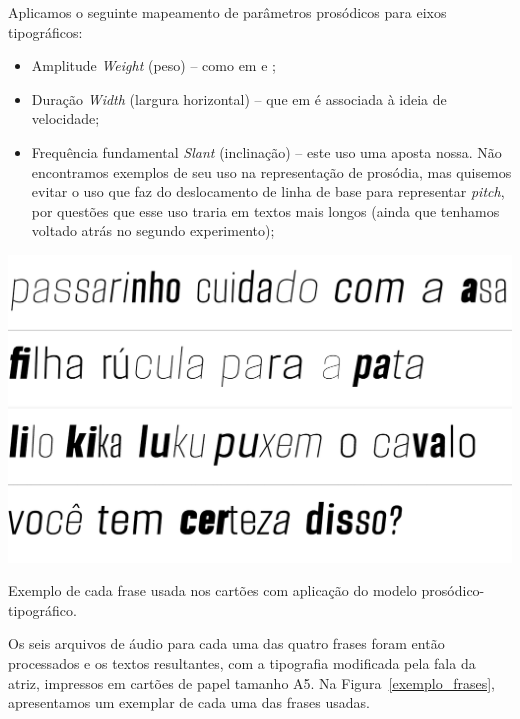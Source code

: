 \documentclass[a4paper]{tufte-handout}
\begin{document}
Aplicamos o seguinte mapeamento de parâmetros prosódicos para eixos tipográficos:

\begin{itemize}
    \item Amplitude \enskip \textrightarrow \enskip \textit{Weight} (peso) -- como em \citet{wolfel2015} e \citet{bessemans2017};
    
    \item Duração \enskip \textrightarrow \enskip \textit{Width} (largura horizontal) -- que em \citet{van2006towards} é associada à ideia de velocidade;
    
    \item Frequência fundamental \enskip \textrightarrow \enskip \textit{Slant} (inclinação) -- este uso uma aposta nossa. Não encontramos exemplos de seu uso na representação de prosódia, mas quisemos evitar o uso que \citet{bessemans2017} faz do deslocamento de linha de base para representar \textit{pitch}, por questões que esse uso traria em textos mais longos (ainda que tenhamos voltado atrás no segundo experimento);
\end{itemize}

\begin{marginfigure}[0.05\baselineskip]
  \includegraphics{imgs/exemplos-frases-2.png}
  \caption{Exemplo de cada frase usada nos cartões com aplicação do modelo prosódico-tipográfico.}
  \label{exemplo_frases}
\end{marginfigure}

Os seis arquivos de áudio para cada uma das quatro frases foram então processados e os textos resultantes, com a tipografia modificada pela fala da atriz, impressos em cartões de papel tamanho A5. Na Figura~\ref{exemplo_frases}, apresentamos um exemplar de cada uma das frases usadas. 
\end{document}
